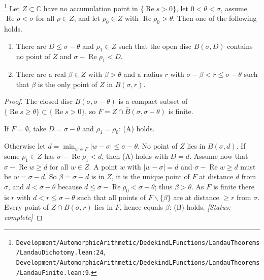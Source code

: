 \begin{lemma}\label{lem:E-dichotomy}
\footnote{\nolinkurl{Development/AutomorphicArithmetic/DedekindLFunctions/LandauTheorems/LandauDichotomy.lean:24}, \nolinkurl{Development/AutomorphicArithmetic/DedekindLFunctions/LandauTheorems/LandauFinite.lean:9}.}%
Let $Z\subset\mathbb C$ have no accumulation point in $\{\operatorname{Re}s>0\}$, let
$0<\theta<\sigma$, assume $\operatorname{Re}\rho<\sigma$ for all $\rho\in Z$, and let
$\rho_0\in Z$ with $\operatorname{Re}\rho_0>\theta$. Then one of the following holds.
\begin{enumerate}
\item[(A)] There are $D\le\sigma-\theta$ and $\rho_1\in Z$ such that the open disc
$B(\sigma,D)$ contains no point of $Z$ and $\sigma-\operatorname{Re}\rho_1<D$.
\item[(B)] There are a real $\beta\in Z$ with $\beta>\theta$ and a radius $r$ with
$\sigma-\beta<r\le\sigma-\theta$ such that $\beta$ is the only point of $Z$ in $B(\sigma,r)$.
\end{enumerate}
\end{lemma}
\begin{proof}
The closed disc $\bar B(\sigma,\sigma-\theta)$ is a compact subset of
$\{\operatorname{Re}s\ge\theta\}\subset\{\operatorname{Re}s>0\}$, so
$F=Z\cap\bar B(\sigma,\sigma-\theta)$ is finite.

If $F=\emptyset$, take $D=\sigma-\theta$ and $\rho_1=\rho_0$: (A) holds.

Otherwise let $d=\min_{w\in F}|w-\sigma|\le\sigma-\theta$. No point of $Z$ lies in $B(\sigma,d)$. If
some $\rho_1\in Z$ has $\sigma-\operatorname{Re}\rho_1<d$, then (A) holds with $D=d$. Assume now
that $\sigma-\operatorname{Re}w\ge d$ for all $w\in Z$. A point $w$ with $|w-\sigma|=d$ and
$\sigma-\operatorname{Re}w\ge d$ must be $w=\sigma-d$. So $\beta=\sigma-d$ is in $Z$, it is the
unique point of $F$ at distance $d$ from $\sigma$, and $d<\sigma-\theta$ because
$d\le\sigma-\operatorname{Re}\rho_0<\sigma-\theta$; thus $\beta>\theta$. As $F$ is finite there is
$r$ with $d<r\le\sigma-\theta$ such that all points of $F\smallsetminus\{\beta\}$ are at distance
$\ge r$ from $\sigma$. Every point of $Z\cap B(\sigma,r)$ lies in $F$, hence equals $\beta$: (B)
holds.
\textit{[Status: complete]}
\end{proof}


